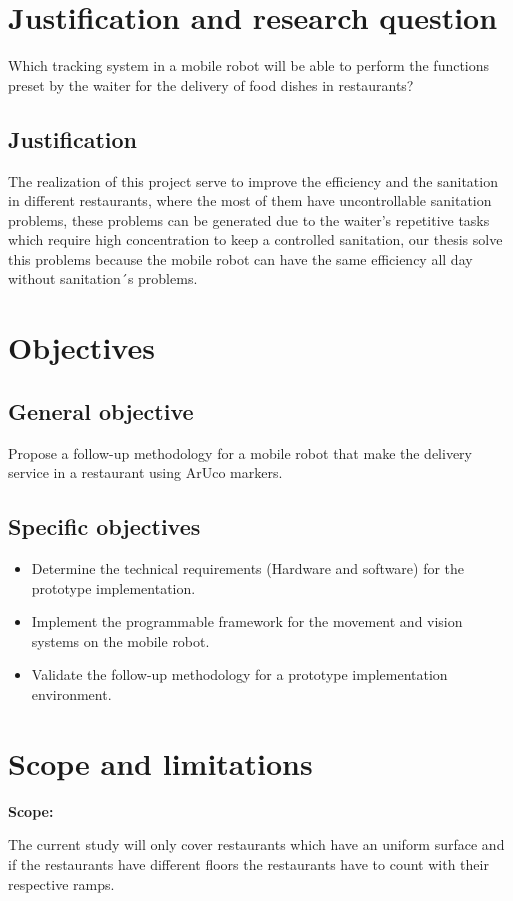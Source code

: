 \section{Justification and research question}
Which tracking system in a mobile robot will be able to perform the functions preset by the waiter for the delivery of food dishes in restaurants?

\subsection{Justification}
The realization of this project serve to improve the efficiency and the sanitation in different restaurants, where the most of them have uncontrollable sanitation problems, these problems can be generated due to the waiter's repetitive tasks which require high concentration to keep a controlled sanitation, our thesis solve this problems because the mobile robot can have the same efficiency all day without sanitation´s problems.   

\section{Objectives}

\subsection{General objective}
Propose a follow-up methodology for a mobile robot that make the delivery service in a restaurant  using ArUco markers. 
\subsection{Specific objectives}
\begin{itemize}
	\item Determine the technical requirements (Hardware and software) for the prototype
	 implementation.
	\item Implement the programmable framework for the movement and vision systems on the mobile robot. 
	\item Validate the follow-up methodology for a prototype implementation environment.
\end{itemize}


\section{Scope and limitations}
\textbf{Scope:}

The current study will only cover restaurants which have an uniform surface and if the restaurants have different floors the restaurants have to count with their respective ramps.

